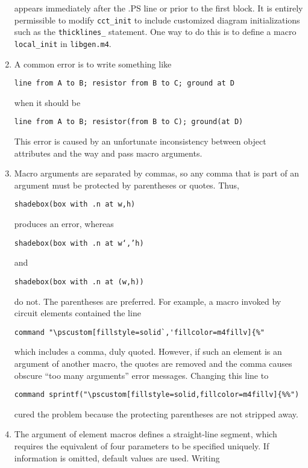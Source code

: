 \begin{enumerate}
\noindent appears immediately after the .PS line or prior to the first block.
It is entirely permissible to modify {\tt cct\_init} to include customized
diagram initializations such as the {\tt thicklines\_} statement.
One way to do this is to define a macro {\tt local\_init} in
{\tt libgen.m4}.
\fi

\item
{}%
  A common error is to write something like

{\tt line from A to B; resistor from B to C; ground at D}

\noindent when it should be

{\tt line from A to B; resistor(from B to C); ground(at D)}

\noindent This error is caused by an unfortunate inconsistency between
\pic object attributes and the way \Mfour and \pic pass macro arguments.

\item 
{}
Macro arguments are separated by commas, so any comma that is
part of an argument must be protected by parentheses or quotes.  Thus,

{\tt shadebox(box with .n at w,h)}

\noindent produces an error, whereas

{\tt shadebox(box with .n at w`,'h)}

\noindent and

{\tt shadebox(box with .n at (w,h))}

\noindent do not. The parentheses are preferred.
For example,
a macro invoked by circuit elements contained the line

\verb|command "\pscustom[fillstyle=solid`,'fillcolor=m4fillv]{%"|

\noindent which includes a comma, duly quoted.  However, if such an
element is an argument of another macro, the quotes are removed and the
comma causes obscure ``too many arguments'' error messages.
Changing this line to

\verb|command sprintf("\pscustom[fillstyle=solid,fillcolor=m4fillv]{%%")|

\noindent
cured the problem because the protecting parentheses are not stripped away.

\item 
{}
The \linespec argument of element
macros defines a straight-line segment, which requires
the equivalent of four parameters to be specified uniquely.
If information is omitted, default values are used.  Writing


\end{enumerate}
